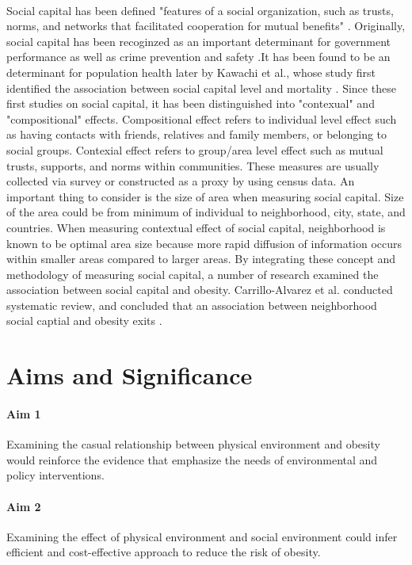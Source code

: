 \documentclass[12]{article}
\begin{document}
\paragraph{}
Social capital has been defined "features of a social organization, such as trusts, norms, and networks that facilitated cooperation for mutual benefits" \cite{krouwel1995making}. Originally, social capital has been recoginzed as an important determinant for government performance as well as crime prevention and safety \cite{sampson1989community}.It has been found to be an determinant for population health later by Kawachi et al., whose study first identified the association between social capital level and mortality \cite{kawachi1997social}. Since these first studies on social capital, it has been distinguished into "contexual" and "compositional" effects. Compositional effect refers to individual level effect such as having contacts with friends, relatives and family members, or belonging to social groups. Contexial effect refers to group/area level effect such as mutual trusts, supports, and norms within communities. These measures are usually collected via survey or constructed as a proxy by using census data. An important thing to consider is the size of area when measuring social capital. Size of the area could be from minimum of individual to neighborhood, city, state, and countries. When measuring contextual effect of social capital, neighborhood is known to be optimal area size because more rapid diffusion of information occurs within smaller areas compared to larger areas. By integrating these concept and methodology of measuring social capital, a number of research examined the association between social capital and obesity. Carrillo-Alvarez et al. conducted systematic review, and concluded that an association between neighborhood social captial and obesity exits \cite{carrillo2019neighbourhood}. 


\section{Aims and Significance}
\paragraph{Aim 1}
Examining the casual relationship between physical environment and obesity would reinforce the evidence that emphasize the needs of environmental and policy interventions. 

\paragraph{Aim 2}
Examining the effect of physical environment and social environment could infer efficient and cost-effective approach to reduce the risk of obesity.
\end{document}
